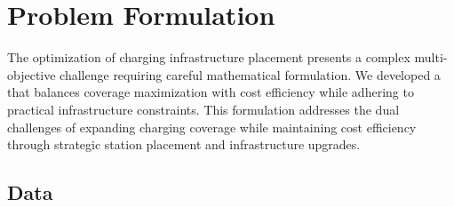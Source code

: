 %
\chapter{Problem Formulation}
%

The optimization of charging infrastructure placement presents a complex multi-objective challenge requiring careful mathematical formulation. We developed a  that balances coverage maximization with cost efficiency while adhering to practical infrastructure constraints. This formulation addresses the dual challenges of expanding charging coverage while maintaining cost efficiency through strategic station placement and infrastructure upgrades.

\section{Data}






